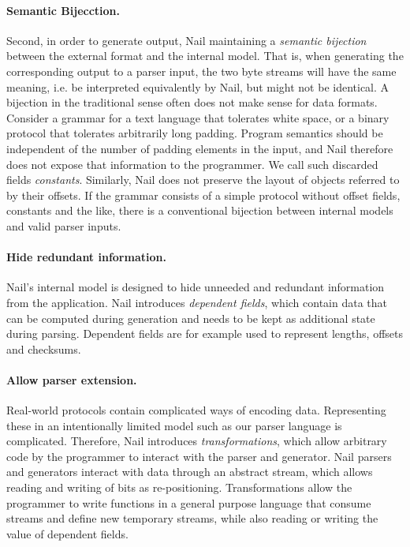 \noindent

\paragraph{Semantic Bijecction.}
Second, in order to generate output, Nail maintaining
a \emph{semantic bijection} between the external format and the internal model. That is, when
generating the corresponding output to a parser input, the two byte streams will have the same
meaning, i.e. be interpreted equivalently by Nail, but might not be identical.
 A bijection in the traditional sense often does not make sense for data
formats. Consider a grammar for a text language that tolerates white space, or a binary protocol
that tolerates arbitrarily long padding.
 Program semantics should be independent of the number of padding elements in the input, and Nail therefore
does not expose that information to the programmer. We call such discarded fields \emph{constants}.
Similarly, Nail does not preserve the layout of objects referred to by their offsets. If the grammar
consists of a simple protocol without offset fields, constants and the like, there is a conventional
bijection between  internal models and valid parser inputs.
\paragraph{Hide redundant information.}
Nail's internal model is designed to hide unneeded and redundant information from the application.
Nail introduces \emph{dependent fields}, which contain data that can be computed during generation
and needs to be kept as additional state during parsing. Dependent fields are for example used to represent
lengths, offsets and checksums.

\paragraph{Allow parser extension.}
Real-world protocols contain complicated ways of encoding data. Representing these in an
intentionally limited model such as our parser language is complicated. Therefore, Nail introduces
\emph{transformations}, which allow arbitrary code by the programmer to interact with the parser and
generator. Nail parsers and generators interact with data through an abstract stream, which allows
reading and writing of bits as re-positioning. Transformations allow the programmer to write
functions in a general purpose language that consume streams and define new temporary streams, while
also reading or writing the value of dependent fields.

